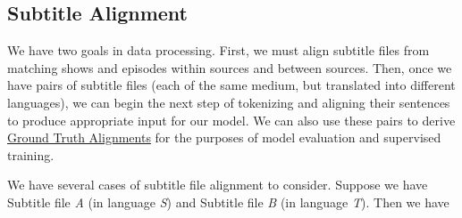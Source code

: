 \documentclass[twoside,twocolumn]{article}
\begin{document}
\subsection{Subtitle Alignment}
\label{subsec:subtitle-alignment}

We have two goals in data processing. First, we must align
subtitle files from matching shows and episodes within sources and between
sources. Then, once we have pairs of subtitle files (each of the same medium,
but translated into different languages), we can begin the next step of
tokenizing and aligning their sentences to produce appropriate input for
our model. We can also use these pairs to derive
\hyperref[subsec:ground-truth-alignments]{Ground Truth Alignments} for the
purposes of model evaluation and supervised training.

We have several cases of subtitle file alignment to consider. Suppose we have
Subtitle file \textit{A} (in language \textit{S}) and Subtitle file \textit{B}
(in language \textit{T}). Then we have
\end{document}
